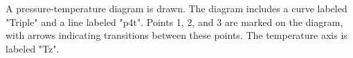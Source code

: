 A pressure-temperature diagram is drawn. The diagram includes a curve labeled "Triple" and a line labeled "p4t". Points 1, 2, and 3 are marked on the diagram, with arrows indicating transitions between these points. The temperature axis is labeled "Tz".